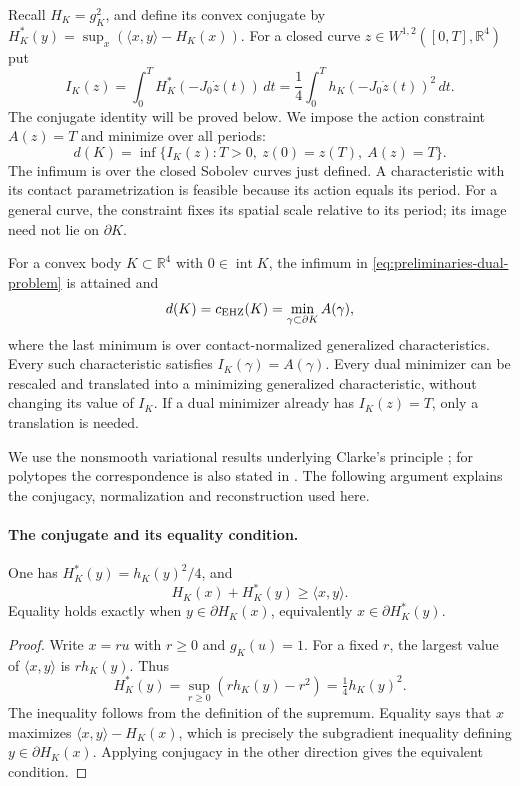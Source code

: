 Recall $H_K=g_K^2$, and define its convex conjugate by
$H_K^*(y)=\sup_x(\langle x,y\rangle-H_K(x))$. For a closed curve
$z\in W^{1,2}([0,T],\mathbb R^4)$ put
\begin{equation}\label{eq:preliminaries-dual-functional}
 I_K(z)=\int_0^T H_K^*(-J_0\dot z(t))\,dt
       =\frac14\int_0^T h_K(-J_0\dot z(t))^2\,dt.
\end{equation}
The conjugate identity will be proved below. We impose the action constraint
$A(z)=T$ and minimize over all periods:
\begin{equation}\label{eq:preliminaries-dual-problem}
 d(K)=\inf\{I_K(z):T>0,\ z(0)=z(T),\ A(z)=T\}.
\end{equation}
The infimum is over the closed Sobolev curves just defined. A characteristic
with its contact parametrization is feasible because its action equals its
period. For a general curve, the constraint fixes its spatial scale relative
to its period; its image need not lie on $\partial K$.

\begin{theorem}
\label{thm:preliminaries-clarke-dual-action}
For a convex body $K\subset\mathbb R^4$ with $0\in\operatorname{int}K$,
the infimum in \eqref{eq:preliminaries-dual-problem} is attained and
\[
 d(K)=c_{\rm EHZ}(K)
     =\min_{\gamma\subset\partial K}A(\gamma),
\]
where the last minimum is over contact-normalized generalized
characteristics. Every such characteristic satisfies $I_K(\gamma)=A(\gamma)$.
Every dual minimizer can be rescaled and translated into a minimizing
generalized characteristic, without changing its value of $I_K$.
If a dual minimizer already has $I_K(z)=T$, only a translation is needed.
\end{theorem}

We use the nonsmooth variational results underlying Clarke's principle
\cite[Proposition~2.5 and Lemmas~5.1--5.2]{AAO2014}; for polytopes the
correspondence is also stated in \cite[Lemma~2.1]{HK2017}. The following
argument explains the conjugacy, normalization and reconstruction used here.

\paragraph{The conjugate and its equality condition.}
\begin{lemma}\label{lem:preliminaries-fenchel-duality}
One has $H_K^*(y)=h_K(y)^2/4$, and
\[
 H_K(x)+H_K^*(y)\geq\langle x,y\rangle.
\]
Equality holds exactly when $y\in\partial H_K(x)$, equivalently
$x\in\partial H_K^*(y)$.
\end{lemma}
\begin{proof}
Write $x=ru$ with $r\geq0$ and $g_K(u)=1$. For a fixed $r$, the largest
value of $\langle x,y\rangle$ is $r h_K(y)$. Thus
\[
 H_K^*(y)=\sup_{r\geq0}(r h_K(y)-r^2)=\tfrac14h_K(y)^2.
\]
The inequality follows from the definition of the supremum. Equality says
that $x$ maximizes $\langle x,y\rangle-H_K(x)$, which is precisely the
subgradient inequality defining $y\in\partial H_K(x)$. Applying conjugacy
in the other direction gives the equivalent condition.
\end{proof}

